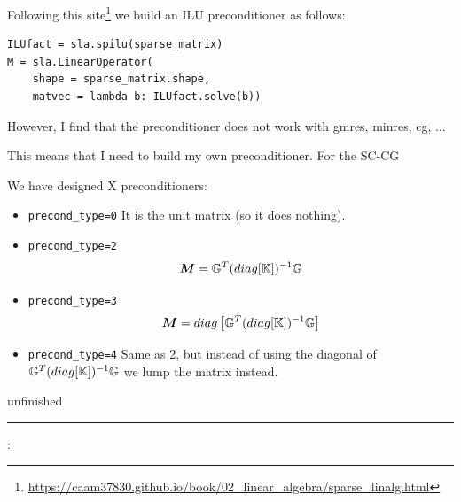 Following this site\footnote{\url{https://caam37830.github.io/book/02_linear_algebra/sparse_linalg.html}}
we build an ILU preconditioner as follows:
\begin{lstlisting}
ILUfact = sla.spilu(sparse_matrix)
M = sla.LinearOperator(
    shape = sparse_matrix.shape,
    matvec = lambda b: ILUfact.solve(b))
\end{lstlisting}
However, I find that the preconditioner does not work with gmres, minres, cg, ...

This means that I need to build my own preconditioner. 
For the SC-CG 

We have designed X preconditioners:
\begin{itemize}
\item {\tt precond\_type=0} It is the unit matrix (so it does nothing). 

\item {\tt precond\_type=2}
\[
{\bm M} = {\mathbb{G}}^T (diag [{\mathbb{K}}]  )^{-1} {\mathbb{G}} 
\]
\item {\tt precond\_type=3} 
\[
{\bm M} = diag \left[ {\mathbb{G}}^T (diag [{\mathbb{K}}]  )^{-1} {\mathbb{G}} \right]
\]
\item {\tt precond\_type=4} Same as 2, but instead of using the 
diagonal of $ {\mathbb{G}}^T (diag [{\mathbb{K}}]  )^{-1} {\mathbb{G}}$ we lump the matrix instead.

\end{itemize}

{\Large unfinished}



\par\noindent\rule{\textwidth}{0.4pt}

\vspace{.5cm}

\begin{center}
\end{center}

\vspace{.5cm}

\Literature:\\







